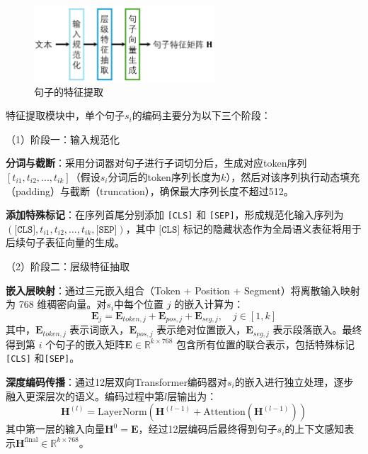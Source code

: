 \begin{figure}[htbp]
    \centering
    \includegraphics[width=0.6\textwidth]{figures/feature_extract.jpg}
    \caption{句子的特征提取}
    \label{fig:method-feature-extract}
\end{figure}

特征提取模块中，单个句子$s_i$的编码主要分为以下三个阶段：

（1）阶段一：输入规范化

\textbf{分词与截断}：采用分词器对句子进行子词切分后，生成对应token序列$[t_{i1}, t_{i2}, ..., t_{ik}]$（假设$s_i$分词后的token序列长度为$k$），然后对该序列执行动态填充（padding）与截断（truncation），确保最大序列长度不超过512。

\textbf{添加特殊标记}：在序列首尾分别添加 \texttt{[CLS]} 和 \texttt{[SEP]}，形成规范化输入序列为 \( (\texttt{[CLS]}, t_{i1}, t_{i2}, \ldots, t_{ik}, \texttt{[SEP]}) \)，其中 \(\texttt{[CLS]} \) 标记的隐藏状态作为全局语义表征将用于后续句子表征向量的生成。

（2）阶段二：层级特征抽取

\textbf{嵌入层映射}：通过三元嵌入组合（Token + Position + Segment）将离散输入映射为 768 维稠密向量。对$s_i$中每个位置 $j$ 的嵌入计算为：
\begin{equation}
    \textbf{E}_j = \textbf{E}_{token,j} + \textbf{E}_{pos,j} + \textbf{E}_{seg,j}, \quad j \in [1,k]
\end{equation}
其中，$\textbf{E}_{token,j}$ 表示词嵌入，$\textbf{E}_{pos,j}$ 表示绝对位置嵌入，$\textbf{E}_{seg,j}$ 表示段落嵌入。最终得到第 $i$ 个句子的嵌入矩阵$\textbf{E} \in \mathbb{R}^{k \times 768}$ 包含所有位置的联合表示，包括特殊标记\texttt{[CLS]} 和\texttt{[SEP]}。

\textbf{深度编码传播}：通过12层双向Transformer编码器对$s_i$的嵌入进行独立处理，逐步融入更深层次的语义。编码过程中第$l$层输出为：
\begin{equation}
    \textbf{H}^{(l)} = \text{LayerNorm}\left(\textbf{H}^{(l-1)} + \text{Attention}(\textbf{H}^{(l-1)})\right)
\end{equation}
其中第一层的输入向量$\textbf{H}^0=\textbf{E}$，经过12层编码后最终得到句子$s_i$的上下文感知表示$\textbf{H}^{\text{final}} \in \mathbb{R}^{k \times 768}$。


